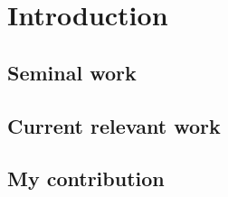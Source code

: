 \documentclass[float=false, crop=false]{standalone}
\begin{document}
\section{Introduction}\label{sec:intro}
\Blindtext[3][2] %
\subsection{Seminal work}\label{sec:semwork}
\Blindtext[1][2]
\subsection{Current relevant work}\label{sec:curwork}
\Blindtext[1][2]
\subsection{My contribution}\label{sec:mywork}
\Blindtext[1][2]
\end{document}
